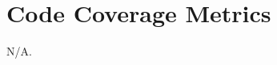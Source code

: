 \documentclass[12pt, titlepage]{article}
\begin{document}
\section{Code Coverage Metrics}
N/A.

% 
% 



\end{document}

